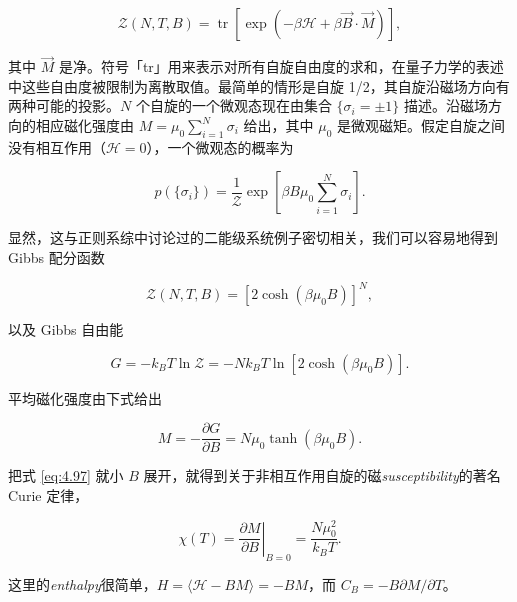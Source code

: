 \begin{equation*}
  \mathcal{Z}(N,T,B)=\operatorname{tr}\left[\exp\left(-\beta\mathscr H+\beta\vec B\cdot\vec M\right)\right],
\end{equation*}

其中 $\vec M$ 是净。符号「tr」用来表示对所有自旋自由度的求和，在量子力学的表述中这些自由度被限制为离散取值。最简单的情形是自旋 1/2，其自旋沿磁场方向有两种可能的投影。$N$ 个自旋的一个微观态现在由集合 $\{\sigma_i=\pm1\}$ 描述。沿磁场方向的相应磁化强度由 $M=\mu_0\sum_{i=1}^N\sigma_i$ 给出，其中 $\mu_0$ 是微观磁矩。假定自旋之间没有相互作用（$\mathscr H=0$），一个微观态的概率为

\begin{equation}\label{eq:4.94}
  p(\{\sigma_i\})=\frac{1}{\mathcal{Z}}\exp\left[\beta B\mu_0\sum_{i=1}^N\sigma_i\right].
\end{equation}

显然，这与正则系综中讨论过的二能级系统例子密切相关，我们可以容易地得到 Gibbs 配分函数

\begin{equation}\label{eq:4.95}
  \mathcal{Z}(N,T,B)=\left[2\cosh(\beta\mu_0B)\right]^N,
\end{equation}

以及 Gibbs 自由能

\begin{equation}\label{eq:4.96}
  G=-k_BT\ln\mathcal{Z}=-Nk_BT\ln\left[2\cosh(\beta\mu_0B)\right].
\end{equation}

平均磁化强度由下式给出

\begin{equation}\label{eq:4.97}
  M=-\frac{\partial G}{\partial B}=N\mu_0\tanh(\beta\mu_0B).
\end{equation}

把式 \eqref{eq:4.97} 就小 $B$ 展开，就得到关于非相互作用自旋的磁\textit{susceptibility}的著名 Curie 定律，

\begin{equation}\label{eq:4.98}
  \chi(T)=\left.\frac{\partial M}{\partial B}\right|_{B=0}=\frac{N\mu_0^2}{k_BT}.
\end{equation}

这里的\textit{enthalpy}很简单，$H=\langle\mathscr H-BM\rangle=-BM$，而 $C_B=-B\partial M/\partial T$。


